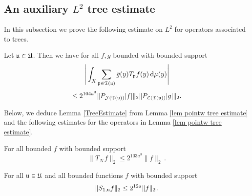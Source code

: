 {\subsection{An auxiliary \texorpdfstring{$L^2$}{L2} tree estimate}

In this subsection we prove the following estimate on $L^2$ for operators associated to trees.

\begin{lemma}
    \label{TreeEstimate}
    Let $\mathfrak u \in \mathfrak U$.
    Then we have for all $f, g$ bounded with bounded support
    $$
        \Bigg|\int_X \sum_{\mathfrak p \in \mathfrak T(\mathfrak u)} \bar g(y) T_{\mathfrak p}f(y) \, \mathrm{d}\mu(y)  \Bigg|
    $$
    \begin{equation}
        \label{eq tree est}
         \le 2^{104a^3}\|P_{\mathcal{J}(\mathfrak T(\mathfrak u))}|f|\|_{2}\|P_{\mathcal{L}(\mathfrak T(\mathfrak u))}|g|\|_{2}.
    \end{equation}
\end{lemma}

Below, we deduce Lemma \ref{TreeEstimate} from Lemma \ref{lem pointw tree estimate} and the following estimates for the operators in Lemma \ref{lem pointw tree estimate}.

\begin{lemma}
    \label{lem nontangential}
    For all bounded $f$ with bounded support
    $$
        \|T_{\mathcal{N}} f\|_2 \le 2^{103a^3} \|f\|_2\,.
    $$
\end{lemma}

\begin{lemma}
    \label{lem L2 Su estimate}
    For all $\mathfrak u \in \mathfrak U$ and all bounded functions $f$ with bounded support
    \begin{equation}
        \label{eq S bound}
        \|S_{1,\mathfrak u}f\|_2 \le 2^{12a} \|f\|_2\,.
    \end{equation}
\end{lemma}

}
